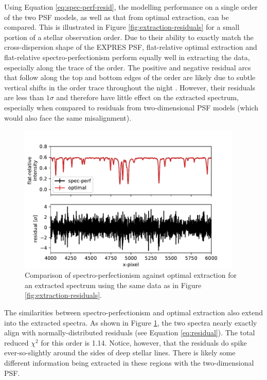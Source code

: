 Using Equation \ref{eq:spec-perf-resid}, the modelling performance on a single order of the two PSF models, as well as that from optimal extraction, can be compared. This is illustrated in Figure \ref{fig:extraction-residuals} for a small portion of a stellar observation order. Due to their ability to exactly match the cross-dispersion shape of the EXPRES PSF, flat-relative optimal extraction and flat-relative spectro-perfectionism perform equally well in extracting the data, especially along the trace of the order. The positive and negative residual arcs that follow along the top and bottom edges of the order are likely due to subtle vertical shifts in the order trace throughout the night \citep[significantly less than one pixel per day,][]{blackman_performance_2020}. However, their residuals are less than $1\sigma$ and therefore have little effect on the extracted spectrum, especially when compared to residuals from two-dimensional PSF models (which would also face the same misalignment).

\begin{figure}
    \centering
    \includegraphics[width=0.95\textwidth]{figures-5/spec-perf-vs-optimal.pdf}
    \caption[Spectro-perfectionism vs. optimal extraction -- Stellar spectrum]{Comparison of spectro-perfectionism against optimal extraction for an extracted spectrum using the same data as in Figure \ref{fig:extraction-residuals}.}
    \label{fig:spec-perf-vs-optimal}
\end{figure}

The similarities between spectro-perfectionism and optimal extraction also extend into the extracted spectra. As shown in Figure \ref{fig:spec-perf-vs-optimal}, the two spectra nearly exactly align with normally-distributed residuals (see Equation \ref{eq:residual}). The total reduced $\chi^2$ for this order is 1.14. Notice, however, that the residuals do spike ever-so-slightly around the sides of deep stellar lines. There is likely some different information being extracted in these regions with the two-dimensional PSF.

